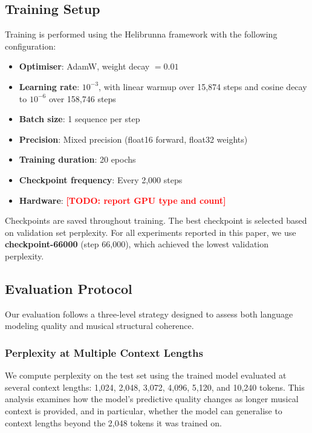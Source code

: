 \documentclass[conference]{IEEEtran}
\newcommand{\TODO}[1]{\textcolor{red}{\textbf{[TODO: #1]}}}
\begin{document}
\subsection{Training Setup}
\label{ssec:training}

Training is performed using the Helibrunna framework with the following
configuration:

\begin{itemize}
    \item \textbf{Optimiser}: AdamW, weight decay $= 0.01$
    \item \textbf{Learning rate}: $10^{-3}$, with linear warmup over
          15,874 steps and cosine decay to $10^{-6}$ over 158,746 steps
    \item \textbf{Batch size}: 1 sequence per step
    \item \textbf{Precision}: Mixed precision (float16 forward,
          float32 weights)
    \item \textbf{Training duration}: 20 epochs
    \item \textbf{Checkpoint frequency}: Every 2,000 steps
    \item \textbf{Hardware}: \TODO{report GPU type and count}
\end{itemize}

Checkpoints are saved throughout training. The best checkpoint is
selected based on validation set perplexity. For all experiments
reported in this paper, we use \textbf{checkpoint-66000} (step 66,000),
which achieved the lowest validation perplexity.

\subsection{Evaluation Protocol}
\label{ssec:eval_protocol}

Our evaluation follows a three-level strategy designed to assess both
language modeling quality and musical structural coherence.

\subsubsection{Perplexity at Multiple Context Lengths}
We compute perplexity on the test set using the trained model evaluated
at several context lengths: 1,024, 2,048, 3,072, 4,096, 5,120, and
10,240 tokens. This analysis examines how the model's predictive quality
changes as longer musical context is provided, and in particular,
whether the model can generalise to context lengths beyond the 2,048
tokens it was trained on.
\end{document}
